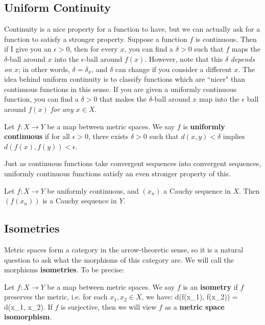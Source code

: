 	\subsection{Uniform Continuity}
	
	Continuity is a nice property for a function to have, but we can actually ask for a function to satisfy a stronger property. Suppose a function $f$ is continuous.  
	Then if I give you an $\epsilon > 0$, then for every $x$, you can find a $\delta > 0$ such that $f$ maps the $\delta$-ball around $x$ into the $\epsilon$-ball 
	around $f(x)$. However, note that this $\delta$ \textit{depends on $x$}; in other words, $\delta = \delta_x$, and $\delta$ can change if you consider a different 
	$x$. The idea behind uniform continuity is to classify functions which are ``nicer" than continuous functions in this sense. If you are given a uniformly 
	continuous function, you can find a $\delta > 0$ that makes the $\delta$-ball around $x$ map into the $\epsilon$ ball around $f(x)$ \textit{for any $x\in X$}. 
	
	\begin{definition}
		Let $f : X\rightarrow Y$ be a map between metric spaces. We say $f$ is \textbf{uniformly continuous} if for all $\epsilon > 0$, there exists $\delta > 0$ 
		such that $d(x, y) < \delta$ implies $d(f(x), f(y)) < \epsilon$. 
	\end{definition}
	
	Just as continuous functions take convergent sequences into convergent sequences, uniformly continuous functions satisfy an even stronger property of 
	this. 
	
	\begin{prop}
		Let $f : X\rightarrow Y$ be uniformly continuous, and $(x_n)$ a Cauchy sequence in $X$. Then $(f(x_n))$ is a Cauchy sequence in $Y$. 
	\end{prop}
	
	\subsection{Isometries}
	
	Metric spaces form a category in the arrow-theoretic sense, so it is a natural question to ask what the morphisms of this category are. We will call the 
	morphisms \textbf{isometries}. To be precise:
	
	\begin{definition}[Isometry]
		Let $f : X\rightarrow Y$ be a map between metric spaces. We say $f$ is an \textbf{isometry} if $f$ preserves the metric, i.e. for each $x_1, x_2
		\in X$, we have:
		\eq
			d(f(x_1), f(x_2)) = d(x_1, x_2).
		\qe
		If $f$ is surjective, then we will view $f$ as a \textbf{metric space isomorphism}.
	\end{definition}
	
